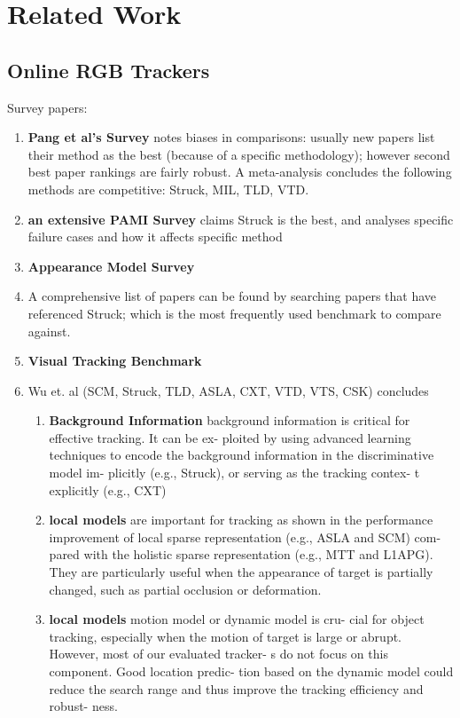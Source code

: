 \chapter{Related Work}

\section{Online RGB Trackers}
Survey papers:
\begin{enumerate}
\item \textbf{Pang et al's Survey} \cite{pang2013finding} notes biases in
comparisons: usually new papers list their method as the best (because of a
specific methodology); however second best paper rankings are fairly robust. A
meta-analysis concludes the following methods are competitive: Struck, MIL, TLD,
VTD. 
\item \textbf{an extensive PAMI Survey} \cite{smeulders2013visual} claims Struck
is the best, and analyses specific failure cases and how it affects specific
method
\item \textbf{Appearance Model Survey} \cite{li2013survey}
\item A comprehensive list of papers can be found by searching papers that have
referenced Struck; which is the most frequently used benchmark to compare
against.
\item \textbf{Visual Tracking Benchmark}\cite{kristan2013visual} 
\item Wu et. al \cite{wu2013online} (SCM, Struck, TLD, ASLA, CXT, VTD, VTS, CSK)
concludes
    \begin{enumerate}
    \item \textbf{Background Information}  background
    information is critical for effective tracking. It can be ex-
    ploited by using advanced learning techniques to encode
    the background information in the discriminative model im-
    plicitly (e.g., Struck), or serving as the tracking contex-
    t explicitly (e.g., CXT)
    \item \textbf{local models}  are important for tracking as shown in the performance improvement
    of local sparse representation (e.g., ASLA and SCM) com-
    pared with the holistic sparse representation (e.g., MTT and
    L1APG). They are particularly useful when the appearance
    of target is partially changed, such as partial occlusion or
    deformation.
    \item \textbf{local models} motion model or dynamic model is cru-
    cial for object tracking, especially when the motion of target
    is large or abrupt. However, most of our evaluated tracker-
    s do not focus on this component. Good location predic-
    tion based on the dynamic model could reduce the search
    range and thus improve the tracking efficiency and robust-
    ness.
    \end{enumerate}
\end{enumerate}

